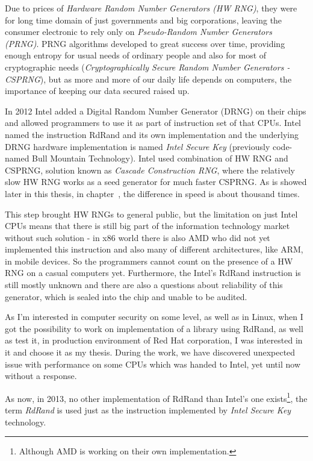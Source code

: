 Due to prices of {\em Hardware Random Number Generators (HW RNG)}, they were for long time domain of just governments and big corporations,%
leaving the consumer electronic to rely only on {\em Pseudo-Random Number Generators (PRNG)}. PRNG algorithms developed to great success over time, providing enough entropy for usual needs of ordinary people and also for most of cryptographic needs ({\em Cryptographically Secure Random Number Generators - CSPRNG}), but as more and more of our daily life depends on computers, the importance of keeping our data secured raised up. 

In 2012\cite{IntelRdRandFindAbout} Intel added a Digital Random Number Generator (DRNG) on their chips and allowed programmers to use it as part of instruction set of that CPUs. Intel named the instruction RdRand and its own implementation and the underlying DRNG hardware implementation is named {\em Intel Secure Key} (previously code-named Bull Mountain Technology)\cite{IntelDRNGAnalysis}. Intel used combination of HW RNG and CSPRNG, solution known as {\em Cascade Construction RNG}, where the relatively slow HW RNG works as a seed generator for much faster CSPRNG. As is showed later in this thesis, in chapter~, the difference in speed is about thousand times.

This step brought HW RNGs to general public, but the limitation on just Intel CPUs means that there is still big part of the information technology market without such solution - in x86 world there is also AMD who did not yet implemented this instruction and also many of different architectures, like ARM, in mobile devices. So the programmers cannot count on the presence of a HW RNG on a casual computers yet. Furthermore, the Intel's RdRand instruction is still mostly unknown and there are also a questions about reliability of this generator, which is sealed into the chip and unable to be audited.\cite{TheodoreTsoNSA}

As I'm interested in computer security on some level, as well as in Linux, when I got the possibility to work on implementation of a library using RdRand, as well as test it, in production environment of Red Hat corporation, I was interested in it and choose it as my thesis. During the work, we have discovered unexpected issue with performance on some CPUs which was handed to Intel, yet until now without a response.

As now, in 2013, no other implementation of RdRand than Intel's one exists\footnote{Although AMD is working on their own implementation.},%
the term {\em RdRand} is used just as the instruction implemented by {\em Intel Secure Key} technology.

